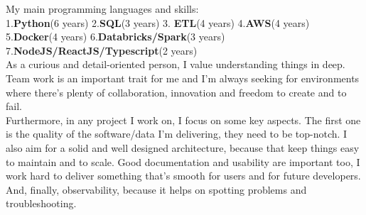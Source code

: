 \documentclass[9pt]{developercv} %
\begin{document}
\vspace{0.5cm}




My main programming languages and skills:\\
1.\textbf{Python}(6 years)   2.\textbf{SQL}(3 years) 3. \textbf{ETL}(4 years) 4.\textbf{AWS}(4 years) 5.\textbf{Docker}(4 years) 6.\textbf{Databricks/Spark}(3 years) \\7.\textbf{NodeJS/ReactJS/Typescript}(2 years)\\

As a curious and detail-oriented person, I value understanding things in deep. Team work is an important trait for me and I'm always seeking for environments where there's plenty of collaboration, innovation and freedom to create and to fail.\\

Furthermore, in any project I work on, I focus on some key aspects. The first one is the quality of the software/data I'm delivering, they need to be top-notch. I also aim for a solid and well designed architecture, because that keep things easy to maintain and to scale. Good documentation and usability are important too, I work hard to deliver something that's smooth for users and for future developers. And, finally, observability, because it helps on spotting problems and troubleshooting.



\end{document}
